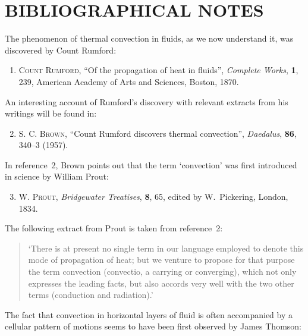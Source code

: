 \section*{BIBLIOGRAPHICAL NOTES}

The phenomenon of thermal convection in fluids, as we now understand it, was
discovered by Count Rumford:

\begin{enumerate}

\item \textsc{Count Rumford}, ``Of the propagation of heat in fluids'',
  \textit{Complete Works}, \textbf{1}, 239, American Academy of Arts and Sciences,
  Boston, 1870.

\end{enumerate}

\noindent An interesting account of Rumford's discovery with relevant extracts from his
writings will be found in:

\begin{enumerate}
\setcounter{enumi}{1}

\item \textsc{S. C. Brown}, ``Count Rumford discovers thermal convection'',
  \textit{Daedalus}, \textbf{86}, 340--3 (1957).

\end{enumerate}

\noindent In reference~2, Brown points out that the term `convection' was first introduced
in science by William Prout:

\begin{enumerate}
\setcounter{enumi}{2}

\item \textsc{W. Prout}, \textit{Bridgewater Treatises}, \textbf{8}, 65, edited by
  W.~Pickering, London, 1834.

\end{enumerate}

\noindent The following extract from Prout is taken from reference~2:

\begin{quote}
`There is at present no single term in our language employed to denote this
mode of propagation of heat; but we venture to propose for that purpose the
term convection (convectio, a carrying or converging), which not only expresses
the leading facts, but also accords very well with the two other terms (conduction
and radiation).'
\end{quote}

\noindent The fact that convection in horizontal layers of fluid is often accompanied by
a cellular pattern of motions seems to have been first observed by James Thomson:

